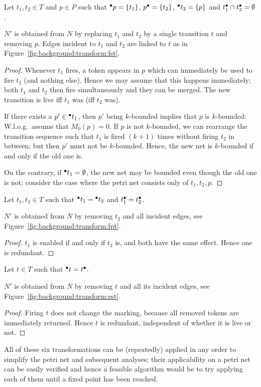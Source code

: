 \begin{lemma}
	Let $t_1,t_2\in T$ and $p\in P$ such that ${}^\bullet p=\left\{t_1\right\}$, $p{}^\bullet=\left\{t_2\right\}$, ${}^\bullet t_2=\left\{p\right\}$ and $t{}^\bullet_1\cap t{}^\bullet_2=\emptyset$.

	$N'$ is obtained from $N$ by replacing $t_1$ and $t_2$ by a single transition $t$ and removing $p$. Edges incident to $t_1$ and $t_2$ are linked to $t$ as in Figure~\ref{fig:background:transform:fst}.
\end{lemma}
\begin{proof}
	Whenever $t_1$ fires, a token appears in $p$ which can immediately be used to fire $t_2$ (and nothing else). Hence we may assume that this happens immediately; both $t_1$ and $t_2$ then fire simultaneously and they can be merged. The new transition is live iff $t_1$ was (iff $t_2$ was).

	If there exists a $p'\in{}^\bullet t_1$, then $p'$ being $k$-bounded implies that $p$ is $k$-bounded: W.l.o.g.\ assume that $M_0(p)=0$. If $p$ is not $k$-bounded, we can rearrange the transition sequence such that $t_1$ is fired $(k+1)$ times without firing $t_2$ in between; but then $p'$ must not be $k$-bounded. Hence, the new net is $k$-bounded if and only if the old one is.

	On the contrary, if ${}^\bullet t_1=\emptyset$, the new net may be bounded even though the old one is not; consider the case where the petri net consists only of $t_1,t_2,p$.
\end{proof}

\begin{lemma}
	Let $t_1,t_2\in T$ such that ${}^\bullet t_1={}^\bullet t_2$ and $t{}^\bullet_1=t{}^\bullet_2$.

	$N'$ is obtained from $N$ by removing $t_2$ and all incident edges, see Figure~\ref{fig:background:transform:fpt}.
\end{lemma}
\begin{proof}
	$t_1$ is enabled if and only if $t_2$ is, and both have the same effect. Hence one is redundant.
\end{proof}

\begin{lemma}
	Let $t\in T$ such that ${}^\bullet t=t{}^\bullet$.
	
	$N'$ is obtained from $N$ by removing $t$ and all its incident edges, see Figure~\ref{fig:background:transform:est}.
\end{lemma}
\begin{proof}
	Firing $t$ does not change the marking, because all removed tokens are immediately returned. Hence $t$ is redundant, independent of whether it is live or not.
\end{proof}

All of these six transformations can be (repeatedly) applied in any order to simplify the petri net and subsequent analyses; their applicability on a petri net can be easily verified and hence a feasible algorithm would be to try applying each of them until a fixed point has been reached.



